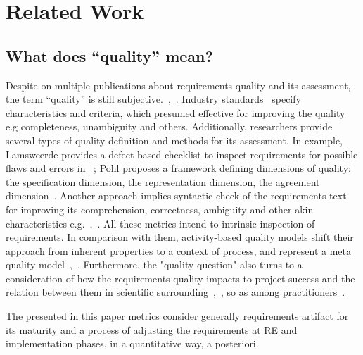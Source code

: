 \section{Related Work}
\label{sec:relatedwork} 

\subsection{What does ``quality'' mean?}

Despite on multiple publications about requirements quality and its assessment, 
the term ``quality'' is still subjective.~\cite{Mund:2017},~\cite{Femmer:2017}. 
Industry standards~\cite{ISO/IEC/IEEE:2011} specify characteristics and criteria, 
which presumed effective for improving the quality e.g completeness, unambiguity and others. 
Additionally, researchers provide several types of quality definition and methods for its assessment. 
In example, Lamsweerde provides a defect-based checklist to inspect requirements for possible flaws 
and errors in ~\cite{Lamsweerde:2009}; Pohl proposes a framework defining dimensions of quality: 
the specification dimension, the representation dimension, the agreement dimension~\cite{POHL:1994}. 
Another approach implies syntactic check of the requirements text for improving its comprehension, 
correctness, ambiguity and other akin characteristics e.g.~\cite{Ferrari:2014},~\cite{Berry:2006}.
All these metrics intend to intrinsic inspection of requirements. In comparison with them, activity-based 
quality models shift their approach from inherent properties to a context of process, and represent 
a meta quality model~\cite{Wagner:2012},~\cite{Femmer:2015}. Furthermore, the "quality question" also turns 
to a consideration of how the requirements quality impacts to project success and the relation between 
them in scientific surrounding~\cite{Emam:1995},~\cite{Kamata:2007}, so as among practitioners~\cite{BeattyHokanson:2014}.

The presented in this paper metrics consider generally requirements artifact for its maturity and a process 
of adjusting the requirements at RE and implementation phases, in a quantitative way, a posteriori.


